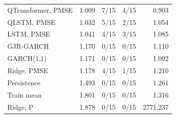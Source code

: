 \begin{tabular}{lrrrr}
QTransformer, PMSE & 1.009 & 7/15 & 4/15 & 0.903 \\
QLSTM, PMSE & 1.032 & 5/15 & 2/15 & 1.054 \\
LSTM, PMSE & 1.041 & 4/15 & 3/15 & 1.085 \\
GJR-GARCH & 1.170 & 0/15 & 0/15 & 1.110 \\
GARCH(1,1) & 1.171 & 0/15 & 0/15 & 1.092 \\
Ridge, PMSE & 1.178 & 4/15 & 1/15 & 1.210 \\
Persistence & 1.493 & 0/15 & 0/15 & 1.261 \\
Train mean & 1.801 & 0/15 & 0/15 & 1.316 \\
Ridge, P & 1.878 & 0/15 & 0/15 & 2771.237 \\
\bottomrule
\end{tabular}
